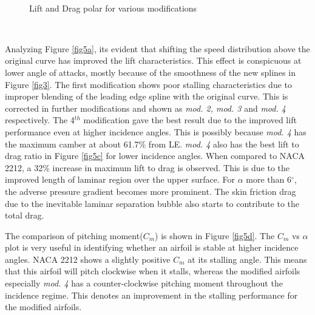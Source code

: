 \documentclass[main.tex]{subfiles}
\begin{document}
\begin{figure}[h!]
     \\
    \caption{Lift and Drag polar for various modifications}
    \label{fig5}
\end{figure}\\
\par\vspace*{-1.5em} Analyzing Figure \ref{fig5a}, its evident that shifting the speed distribution above the original curve has improved the lift characteristics. This effect is conspicuous at lower angle of attacks, mostly because of the smoothness of the new splines in Figure \ref{fig3}. The first modification shows poor stalling characteristics due to improper blending of the leading edge spline with the original curve. This is corrected in further modifications and shown as \textit{mod. 2, mod. 3} and \textit{mod. 4} respectively. The 4$^{th}$ modification gave the best result due to the improved lift performance even at higher incidence angles. This is possibly because \textit{mod. 4} has the maximum camber at about 61.7\% from LE. \textit{mod. 4} also has the best lift to drag ratio in Figure \ref{fig5c} for lower incidence angles. When compared to NACA 2212, a 32\% increase in maximum lift to drag is observed. This is due to the improved length of laminar region over the upper surface. For $\alpha$ more than 6$^\circ$, the adverse pressure gradient becomes more prominent. The skin friction drag due to the inevitable laminar separation bubble also starts to contribute to the total drag.
\\\par The comparison of pitching moment($C_m$) is shown in Figure \ref{fig5d}. The $C_m$ vs $\alpha$ plot is very useful in identifying whether an airfoil is stable at higher incidence angles. NACA 2212 shows a slightly positive $C_m$ at its stalling angle. This means that this airfoil will pitch clockwise when it stalls, whereas the modified airfoils especially \textit{mod. 4} has a counter-clockwise pitching moment throughout the incidence regime. This denotes an improvement in the stalling performance for the modified airfoils.
\end{document}
